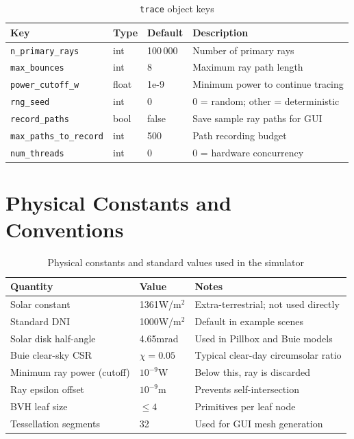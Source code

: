 \documentclass[12pt,a4paper]{report}
\begin{document}
\begin{table}[H]\centering
\caption{\texttt{trace} object keys}
\begin{tabular}{lllp{5.5cm}}
\toprule
Key & Type & Default & Description \\
\midrule
\texttt{n\_primary\_rays}      & int   & 100\,000 & Number of primary rays \\
\texttt{max\_bounces}          & int   & 8        & Maximum ray path length \\
\texttt{power\_cutoff\_w}      & float & 1e-9     & Minimum power to continue tracing \\
\texttt{rng\_seed}             & int   & 0        & 0 = random; other = deterministic \\
\texttt{record\_paths}         & bool  & false    & Save sample ray paths for GUI \\
\texttt{max\_paths\_to\_record}& int   & 500      & Path recording budget \\
\texttt{num\_threads}          & int   & 0        & 0 = hardware concurrency \\
\bottomrule
\end{tabular}
\end{table}

\chapter{Physical Constants and Conventions}

\begin{table}[H]\centering
\caption{Physical constants and standard values used in the simulator}
\begin{tabular}{lll}
\toprule
Quantity & Value & Notes \\
\midrule
Solar constant              & 1361\;W/m$^2$  & Extra-terrestrial; not used directly \\
Standard DNI                & 1000\;W/m$^2$  & Default in example scenes \\
Solar disk half-angle       & 4.65\;mrad     & Used in Pillbox and Buie models \\
Buie clear-sky CSR          & $\chi = 0.05$  & Typical clear-day circumsolar ratio \\
Minimum ray power (cutoff)  & $10^{-9}$\;W   & Below this, ray is discarded \\
Ray epsilon offset          & $10^{-9}$\;m   & Prevents self-intersection \\
BVH leaf size               & $\leq 4$       & Primitives per leaf node \\
Tessellation segments       & 32             & Used for GUI mesh generation \\
\bottomrule
\end{tabular}
\end{table}
\end{document}
